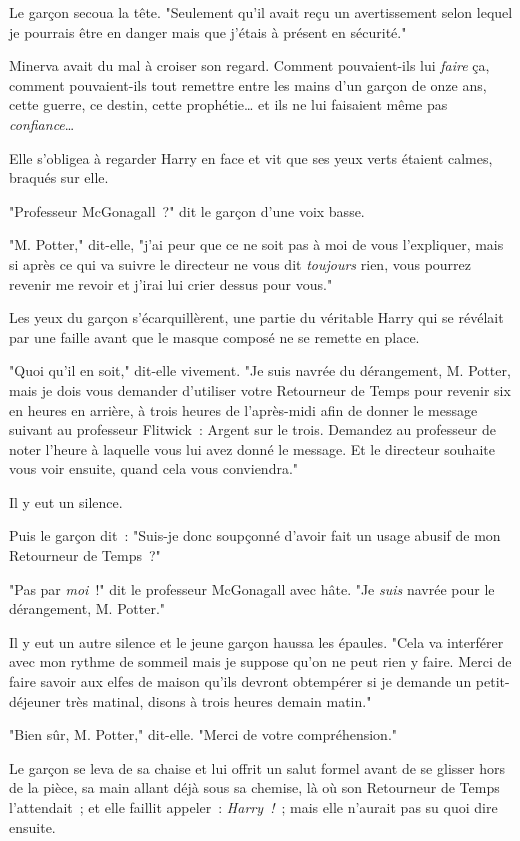 Le garçon secoua la tête. "Seulement qu'il avait reçu un avertissement selon lequel je pourrais être en danger mais que j'étais à présent en sécurité."

Minerva avait du mal à croiser son regard. Comment pouvaient-ils lui \emph{faire} ça, comment pouvaient-ils tout remettre entre les mains d'un garçon de onze ans, cette guerre, ce destin, cette prophétie… et ils ne lui faisaient même pas \emph{confiance}…

Elle s'obligea à regarder Harry en face et vit que ses yeux verts étaient calmes, braqués sur elle.

"Professeur McGonagall~?" dit le garçon d'une voix basse.

"M. Potter," dit-elle, "j'ai peur que ce ne soit pas à moi de vous l'expliquer, mais si après ce qui va suivre le directeur ne vous dit \emph{toujours} rien, vous pourrez revenir me revoir et j'irai lui crier dessus pour vous."

Les yeux du garçon s'écarquillèrent, une partie du véritable Harry qui se révélait par une faille avant que le masque composé ne se remette en place.

"Quoi qu'il en soit," dit-elle vivement. "Je suis navrée du dérangement, M. Potter, mais je dois vous demander d'utiliser votre Retourneur de Temps pour revenir six en heures en arrière, à trois heures de l'après-midi afin de donner le message suivant au professeur Flitwick~: Argent sur le trois. Demandez au professeur de noter l'heure à laquelle vous lui avez donné le message. Et le directeur souhaite vous voir ensuite, quand cela vous conviendra."

Il y eut un silence.

Puis le garçon dit~: "Suis-je donc soupçonné d'avoir fait un usage abusif de mon Retourneur de Temps~?"

"Pas par \emph{moi}~!" dit le professeur McGonagall avec hâte. "Je \emph{suis} navrée pour le dérangement, M. Potter."

Il y eut un autre silence et le jeune garçon haussa les épaules. "Cela va interférer avec mon rythme de sommeil mais je suppose qu'on ne peut rien y faire. Merci de faire savoir aux elfes de maison qu'ils devront obtempérer si je demande un petit-déjeuner très matinal, disons à trois heures demain matin."

"Bien sûr, M. Potter," dit-elle. "Merci de votre compréhension."

Le garçon se leva de sa chaise et lui offrit un salut formel avant de se glisser hors de la pièce, sa main allant déjà sous sa chemise, là où son Retourneur de Temps l'attendait~; et elle faillit appeler~: \emph{Harry~!}~; mais elle n'aurait pas su quoi dire ensuite.

